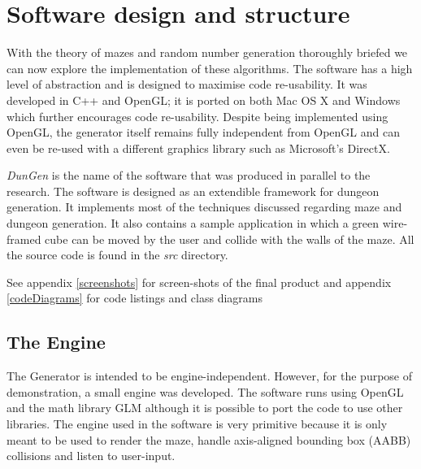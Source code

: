 \chapter{Software design and structure}
With the theory of mazes and random number generation thoroughly briefed we can now explore the implementation of these algorithms. The software has a high level of abstraction and is designed to maximise code re-usability. It was developed in C++ and OpenGL; it is ported on both Mac OS X and Windows which further encourages code re-usability. Despite being implemented using OpenGL, the generator itself remains fully independent from OpenGL and can even be re-used with a different graphics library such as Microsoft's DirectX.

{\em DunGen} is the name of the software that was produced in parallel to the research. The software is designed as an extendible framework for dungeon generation. It implements most of the techniques discussed regarding maze and dungeon generation. It also contains a sample application in which a green wire-framed cube can be moved by the user and collide with the walls of the maze. All the source code is found in the {\em src} directory.

See appendix \ref{screenshots} for screen-shots of the final product and appendix \ref{codeDiagrams} for code listings and class diagrams

\section{The Engine}
The Generator is intended to be engine-independent. However, for the purpose of demonstration, a small engine was developed. The software runs using OpenGL and the math library GLM although it is possible to port the code to use other libraries. The engine used in the software is very primitive because it is only meant to be used to render the maze, handle axis-aligned bounding box (AABB) collisions and listen to user-input.

